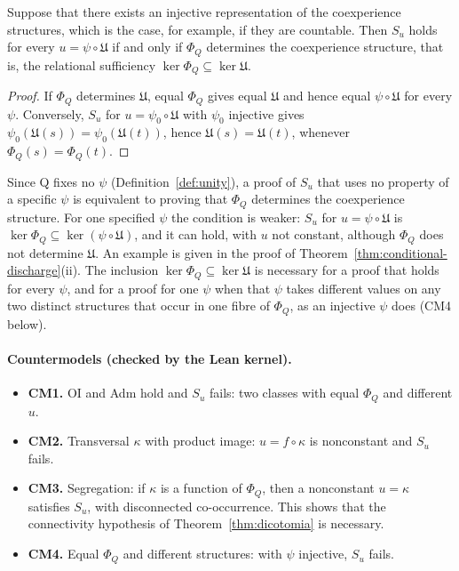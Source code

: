 \begin{theorem}\label{thm:robusta}
Suppose that there exists an injective representation of the coexperience structures, which is the case, for example, if they are countable. Then $S_u$ holds for every $u=\psi\circ\mathfrak U$ if and only if $\Phi_Q$ determines the coexperience structure, that is, the relational sufficiency $\ker\Phi_Q\subseteq\ker\mathfrak U$.
\end{theorem}
\begin{proof}
If $\Phi_Q$ determines $\mathfrak U$, equal $\Phi_Q$ gives equal $\mathfrak U$ and hence equal $\psi\circ\mathfrak U$ for every $\psi$. Conversely, $S_u$ for $u=\psi_0\circ\mathfrak U$ with $\psi_0$ injective gives $\psi_0(\mathfrak U(s))=\psi_0(\mathfrak U(t))$, hence $\mathfrak U(s)=\mathfrak U(t)$, whenever $\Phi_Q(s)=\Phi_Q(t)$.
\end{proof}
Since Q fixes no $\psi$ (Definition~\ref{def:unity}), a proof of $S_u$ that uses no property of a specific $\psi$ is equivalent to proving that $\Phi_Q$ determines the coexperience structure. For one specified $\psi$ the condition is weaker: $S_u$ for $u=\psi\circ\mathfrak U$ is $\ker\Phi_Q\subseteq\ker(\psi\circ\mathfrak U)$, and it can hold, with $u$ not constant, although $\Phi_Q$ does not determine $\mathfrak U$. An example is given in the proof of Theorem~\ref{thm:conditional-discharge}(ii). The inclusion $\ker\Phi_Q\subseteq\ker\mathfrak U$ is necessary for a proof that holds for every $\psi$, and for a proof for one $\psi$ when that $\psi$ takes different values on any two distinct structures that occur in one fibre of $\Phi_Q$, as an injective $\psi$ does (CM4 below). \stA

\paragraph{Countermodels (checked by the Lean kernel).}
\begin{itemize}
\item \textbf{CM1.} OI and Adm hold and $S_u$ fails: two classes with equal $\Phi_Q$ and different $u$.
\item \textbf{CM2.} Transversal $\kappa$ with product image: $u=f\circ\kappa$ is nonconstant and $S_u$ fails.
\item \textbf{CM3.} Segregation: if $\kappa$ is a function of $\Phi_Q$, then a nonconstant $u=\kappa$ satisfies $S_u$, with disconnected co-occurrence. This shows that the connectivity hypothesis of Theorem~\ref{thm:dicotomia} is necessary.
\item \textbf{CM4.} Equal $\Phi_Q$ and different structures: with $\psi$ injective, $S_u$ fails.
\end{itemize}

